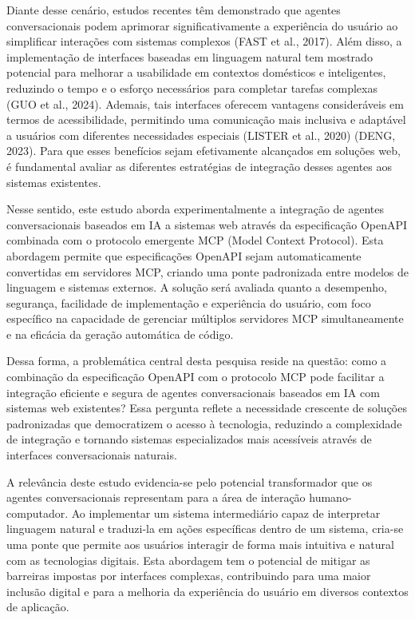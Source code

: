\documentclass[
]{article}
\begin{document}
Diante desse cenário, estudos recentes têm demonstrado que agentes
conversacionais podem aprimorar significativamente a experiência do
usuário ao simplificar interações com sistemas complexos (FAST et al.,
2017). Além disso, a implementação de interfaces baseadas em linguagem
natural tem mostrado potencial para melhorar a usabilidade em contextos
domésticos e inteligentes, reduzindo o tempo e o esforço necessários
para completar tarefas complexas (GUO et al., 2024). Ademais, tais
interfaces oferecem vantagens consideráveis em termos de acessibilidade,
permitindo uma comunicação mais inclusiva e adaptável a usuários com
diferentes necessidades especiais (LISTER et al., 2020) (DENG, 2023).
Para que esses benefícios sejam efetivamente alcançados em soluções web,
é fundamental avaliar as diferentes estratégias de integração desses
agentes aos sistemas existentes.

Nesse sentido, este estudo aborda experimentalmente a integração de
agentes conversacionais baseados em IA a sistemas web através da
especificação OpenAPI combinada com o protocolo emergente MCP (Model
Context Protocol). Esta abordagem permite que especificações OpenAPI
sejam automaticamente convertidas em servidores MCP, criando uma ponte
padronizada entre modelos de linguagem e sistemas externos. A solução
será avaliada quanto a desempenho, segurança, facilidade de
implementação e experiência do usuário, com foco específico na
capacidade de gerenciar múltiplos servidores MCP simultaneamente e na
eficácia da geração automática de código.

Dessa forma, a problemática central desta pesquisa reside na questão:
como a combinação da especificação OpenAPI com o protocolo MCP pode
facilitar a integração eficiente e segura de agentes conversacionais
baseados em IA com sistemas web existentes? Essa pergunta reflete a
necessidade crescente de soluções padronizadas que democratizem o acesso
à tecnologia, reduzindo a complexidade de integração e tornando sistemas
especializados mais acessíveis através de interfaces conversacionais
naturais.

A relevância deste estudo evidencia-se pelo potencial transformador que
os agentes conversacionais representam para a área de interação
humano-computador. Ao implementar um sistema intermediário capaz de
interpretar linguagem natural e traduzi-la em ações específicas dentro
de um sistema, cria-se uma ponte que permite aos usuários interagir de
forma mais intuitiva e natural com as tecnologias digitais. Esta
abordagem tem o potencial de mitigar as barreiras impostas por
interfaces complexas, contribuindo para uma maior inclusão digital e
para a melhoria da experiência do usuário em diversos contextos de
aplicação.
\end{document}
